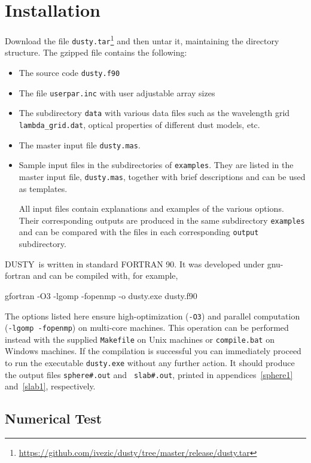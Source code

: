 \documentclass[11pt]{article}
\def\D    {{\sf DUSTY}}
\begin{document}
\section{Installation}
\label{sec:installation}

Download the file {\tt dusty.tar}\footnote{\url{https://github.com/ivezic/dusty/tree/master/release/dusty.tar}}
and then untar it, maintaining the directory structure. The gzipped file contains the following:
%
\begin{itemize}
%
\item The source code {\tt dusty.f90}
%
\item The file {\tt userpar.inc} with user adjustable array sizes
%
\item The subdirectory {\tt data} with various data files such as the
  wavelength grid {\tt lambda\_grid.dat}, optical properties of
  different dust models, etc.
%
\item The master input file {\tt dusty.mas}.
%
\item Sample input files in the subdirectories of {\tt examples}. They
  are listed in the master input file, {\tt dusty.mas}, together with
  brief descriptions and can be used as templates.
%

  All input files contain explanations and examples of the various
  options.  Their corresponding outputs are produced in the same
  subdirectory {\tt examples} and can be compared with the files in
  each corresponding {\tt output} subdirectory.
\end{itemize}

\D\ is written in standard FORTRAN 90. It was developed under
gnu-fortran and can be compiled with, for example,

\bigskip

{\tt

  gfortran -O3 -lgomp -fopenmp -o dusty.exe dusty.f90 }

\bigskip\noindent The options listed here ensure high-optimization
({\tt -O3}) and parallel computation ({\tt -lgomp -fopenmp}) on
multi-core machines. This operation can be performed instead with the
supplied {\tt Makefile} on Unix machines or {\tt compile.bat} on
Windows machines. If the compilation is successful you can immediately
proceed to run the executable {\tt dusty.exe} without any further
action. It should produce the output files {\tt sphere\#.out} and {\tt
  slab\#.out}, printed in appendices~\ref{sphere1} and~\ref{slab1},
respectively.

\subsection{Numerical Test}
\end{document}
